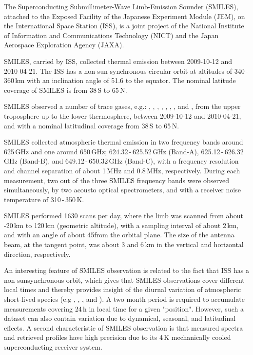 The Superconducting Submillimeter-Wave Limb-Emission Sounder (SMILES),
attached to the Exposed Facility of the Japanese Experiment Module (JEM), 
on the International Space Station (ISS), is a joint project of the
National Institute of Information and Communications Technology (NICT) and
the Japan Aerospace Exploration Agency (JAXA).

SMILES, carried by ISS, collected thermal emission
between 2009-10-12 and 2010-04-21.
The ISS has a non-sun-synchronous circular orbit at
altitudes of 340\,-\,360\,km with an inclination angle of 51.6\degree
to the equator. The nominal latitude coverage of SMILES is from 38\degree\,S
to 65\degree\,N.

SMILES observed a number  
of trace gases, e.g.: , , , 
, , , , and , 
from the upper troposphere up to the lower thermosphere,  
between 2009-10-12 and 2010-04-21, and with a nominal latitudinal coverage 
from 38\degree\,S to 65\degree\,N.

SMILES collected atmospheric thermal emission in two frequency
bands around 625\,GHz and one around 650\,GHz;
624.32\,-\,625.52\,GHz (Band-A), 625.12\,-\,626.32\,GHz (Band-B),
and 649.12\,-\,650.32\,GHz (Band-C), with a frequency resolution
and channel separation of about 1\,MHz and 0.8\,MHz, 
respectively.  
During each measurement, two out of the three SMILES frequency
bands were observed simultaneously, by two acousto optical spectrometers,
and with a receiver noise temperature of 310\,-\,350\,K.

SMILES performed 1630 scans per day, where the limb was scanned
from about -20\,km to 120\,km (geometric altitude), 
with a sampling interval of about 2\,km, and with an angle of 
about 45\degree from the orbital plane. The size of the antenna beam, 
at the tangent point, was about 3 and 6\,km in the vertical and 
horizontal direction, respectively. 

An interesting feature of SMILES observation is related to the fact
that ISS has a non-sunsynchronous orbit, which gives that SMILES 
observations cover different local times and thereby provides insight
of the diurnal variation of atmospheric short-lived species
(e.g , , , and ). 
A two month period is required to accumulate measurements covering 
24\,h in local time for a given "position". However, such a 
dataset can also contain variation due to dynamical, seasonal, and 
latitudinal effects.
A second characteristic of SMILES observation is that 
measured spectra and retrieved profiles have high precision due 
to its 4\,K mechanically cooled superconducting receiver system.

